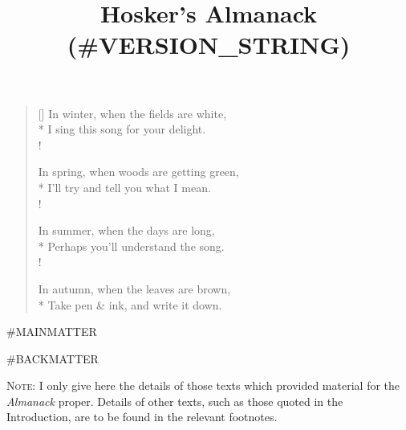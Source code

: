 \documentclass{amsbook}
\title{Hosker's Almanack (#VERSION_STRING)}
\begin{document}
\frontmatter

\maketitle

\settowidth{\versewidth}{In winter, when the fields are white,}
\begin{verse}[\versewidth]
    In winter, when the fields are white,\\*
    I sing this song for your delight.\\!

    In spring, when woods are getting green,\\*
    I'll try and tell you what I mean.\\!

    In summer, when the days are long,\\*
    Perhaps you'll understand the song.\\!

    In autumn, when the leaves are brown,\\*
    Take pen \& ink, and write it down.
\end{verse}

\tableofcontents


\renewcommand\chaptername{Month}

\mainmatter

\renewcommand\thesection{{\Roman{section}}}
\renewcommand\thefootnote{{\thesubsection.}}
\makeatletter
    \def\blfootnote{\xdef\@thefnmark{}\@footnotetext}
    \renewcommand{\@makefnmark}{\hbox{{{{\@thefnmark}}}}\hbox{{{{ }}}}}
\makeatother

#MAINMATTER


\renewcommand\thesection{{\arabic{section}}}
\renewcommand\thefootnote{{\arabic{section}}}

#BACKMATTER

\printbibliography[title={Sources}]

\bigskip

{\footnotesize \textsc{Note:} I only give here the details of those texts which provided material for the \textit{Almanack} proper. Details of other texts, such as those quoted in the Introduction, are to be found in the relevant footnotes.}
\end{document}
